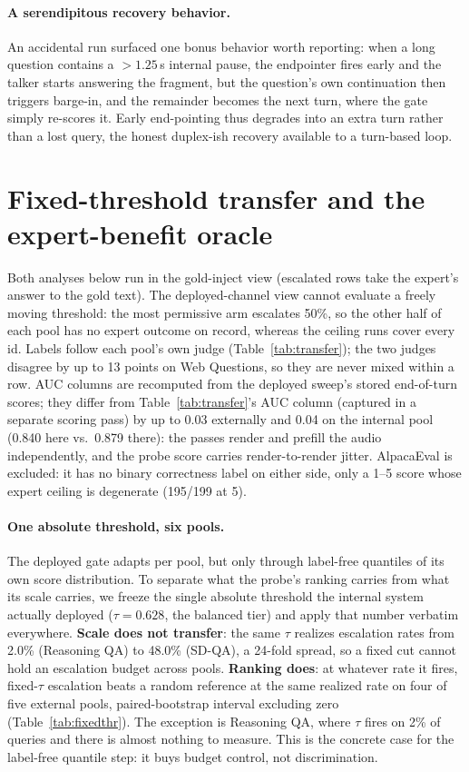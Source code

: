 \paragraph{A serendipitous recovery behavior.}
An accidental run surfaced one bonus behavior worth reporting: when a
long question contains a ${>}1.25$\,s internal pause, the endpointer
fires early and the talker starts answering the fragment, but the
question's own continuation then triggers barge-in, and the remainder
becomes the next turn, where the gate simply re-scores it. Early
end-pointing thus degrades into an extra turn rather than a lost query, the honest duplex-ish recovery available to a turn-based loop.

\section{Fixed-threshold transfer and the expert-benefit oracle}
\label{app:fixedthr}

Both analyses below run in the gold-inject view (escalated rows
take the expert's answer to the gold text). The deployed-channel view
cannot evaluate a freely moving threshold: the most permissive arm
escalates 50\%, so the other half of each pool has no expert outcome on
record, whereas the ceiling runs cover every id. Labels follow each
pool's own judge (Table~\ref{tab:transfer}); the two judges disagree by
up to 13 points on Web Questions, so they are never mixed within a row.
AUC columns are recomputed from the deployed sweep's stored
end-of-turn scores; they differ from Table~\ref{tab:transfer}'s AUC
column (captured in a separate scoring pass) by up to 0.03
externally and 0.04 on the internal pool (0.840 here vs.\ 0.879 there):
the passes render and prefill the audio independently, and the probe
score carries render-to-render jitter.
AlpacaEval is excluded: it has no binary correctness label on either
side, only a 1--5 score whose expert ceiling is degenerate (195/199 at
5).

\paragraph{One absolute threshold, six pools.}
The deployed gate adapts per pool, but only through label-free
quantiles of its own score distribution. To separate what the probe's
ranking carries from what its scale carries, we freeze
the single absolute threshold the internal system actually deployed
($\tau{=}0.628$, the balanced tier) and apply that number verbatim
everywhere. \textbf{Scale does not transfer}: the same $\tau$ realizes
escalation rates from 2.0\% (Reasoning QA) to 48.0\% (SD-QA), a
24-fold spread, so a fixed cut cannot hold an escalation budget across
pools. \textbf{Ranking does}: at whatever rate it fires, fixed-$\tau$
escalation beats a random reference at the same realized rate on four
of five external pools, paired-bootstrap interval excluding zero
(Table~\ref{tab:fixedthr}). The exception is Reasoning QA, where
$\tau$ fires on 2\% of queries and there is almost nothing to measure.
This is the concrete case for the label-free quantile step: it buys
budget control, not discrimination.

